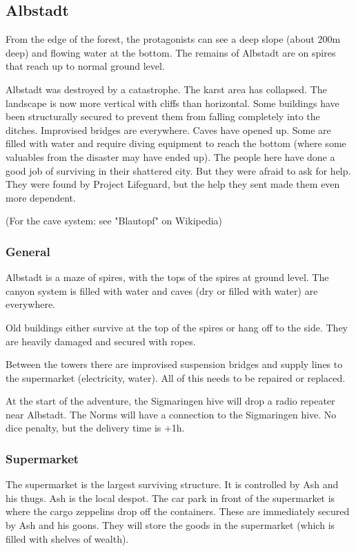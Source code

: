 \subsection{Albstadt}

From the edge of the forest, the protagonists can see a deep slope (about 200m deep) and flowing water at the bottom. The remains of Albstadt are on spires that reach up to normal ground level.

Albstadt was destroyed by a catastrophe. The karst area has collapsed. The landscape is now more vertical with cliffs than horizontal. Some buildings have been structurally secured to prevent them from falling completely into the ditches. Improvised bridges are everywhere. Caves have opened up. Some are filled with water and require diving equipment to reach the bottom (where some valuables from the disaster may have ended up).
The people here have done a good job of surviving in their shattered city. But they were afraid to ask for help. They were found by Project Lifeguard, but the help they sent made them even more dependent.

(For the cave system: see "Blautopf" on Wikipedia)

\subsubsection{General}

Albstadt is a maze of spires, with the tops of the spires at ground level. The canyon system is filled with water and caves (dry or filled with water) are everywhere.

Old buildings either survive at the top of the spires or hang off to the side. They are heavily damaged and secured with ropes.

Between the towers there are improvised suspension bridges and supply lines to the supermarket (electricity, water). All of this needs to be repaired or replaced.

At the start of the adventure, the Sigmaringen hive will drop a radio repeater near Albstadt. The Norms will have a connection to the Sigmaringen hive. No dice penalty, but the delivery time is +1h.

\subsubsection{Supermarket}

The supermarket is the largest surviving structure. It is controlled by Ash and his thugs. Ash is the local despot. The car park in front of the supermarket is where the cargo zeppelins drop off the containers. These are immediately secured by Ash and his goons.
They will store the goods in the supermarket (which is filled with shelves of wealth).

